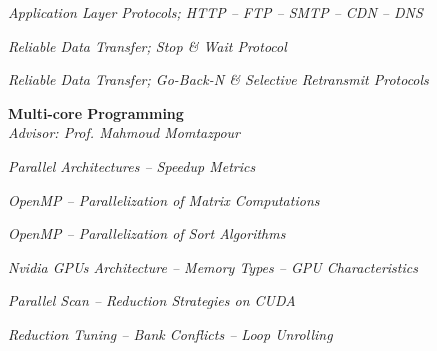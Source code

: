 \documentclass[margin, 10pt]{res} %
\begin{document}
\begin{resume}
\begin{innerlist}
			\item \textit{Application Layer Protocols; HTTP -- FTP -- SMTP -- CDN -- DNS} \href{https://github.com/aligholamee/Compnets/raw/master/docs/assignment-6/compnet_assignment_6_9531504.pdf}{\hfill\UrlFont[docs]}
			
			
			\item \textit{Reliable Data Transfer; Stop \& Wait Protocol} \href{https://github.com/aligholamee/Compnets/raw/master/docs/assignment-8/compnet_assignment_8_9531504.pdf}{\hfill\UrlFont[docs]}
			
			\item \textit{Reliable Data Transfer; Go-Back-N \& Selective Retransmit Protocols} \href{https://github.com/aligholamee/Compnets/raw/master/docs/assignment-9/compnet_assignment_9_9531504.pdf}{\hfill\UrlFont[docs]}
		\end{innerlist}
	
        \textbf{Multi-core Programming}\\
			\textit{Advisor: Prof. Mahmoud Momtazpour}
			\begin{innerlist}
				\item \textit{Parallel Architectures -- Speedup Metrics} \href{https://github.com/aligholamee/Parallax/raw/master/docs/assignment-1/MCP_9531504_HW1.pdf}{\hfill\UrlFont[docs]}
				
				\item \textit{OpenMP -- Parallelization of Matrix Computations} \href{https://github.com/aligholamee/Parallax/raw/master/docs/assignment-2/MCP_9531504_HW2.pdf}{\hfill\UrlFont[docs]}
				
				\item \textit{OpenMP -- Parallelization of Sort Algorithms} \href{https://github.com/aligholamee/Parallax/raw/master/docs/assignment-3/MCP_9531504_HW3.pdf}{\hfill\UrlFont[docs]}

				\item \textit{Nvidia GPUs Architecture -- Memory Types -- GPU Characteristics} \href{https://github.com/aligholamee/Parallax/raw/master/docs/assignment-4/MCP_9531504_HW4.pdf}{\hfill\UrlFont[docs]}

				\item \textit{Parallel Scan -- Reduction Strategies on CUDA} \href{https://github.com/aligholamee/Parallax/raw/master/docs/assignment-5/MCP_9531504_HW5.pdf}{\hfill\UrlFont[docs]}
				
				\item \textit{Reduction Tuning -- Bank Conflicts -- Loop Unrolling} \href{https://github.com/aligholamee/Parallax/raw/master/docs/assignment-6/MCP_9531504_HW6.pdf}{\hfill\UrlFont[docs]}
				

\end{innerlist}
\end{resume}
\end{document}
